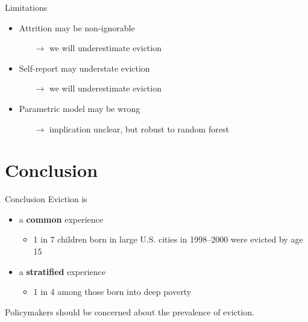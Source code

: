 \documentclass{beamer}
\newcommand\bblue[1]{{\color{blue}\textbf{#1}}}
\begin{document}
\begin{frame}{Limitations}
\begin{itemize}
\item Attrition may be non-ignorable \pause
\begin{itemize}
\item[$\rightarrow$] we will underestimate eviction
\end{itemize} \pause
\item Self-report may understate eviction \pause 
\begin{itemize}
\item[$\rightarrow$] we will underestimate eviction \pause
\end{itemize}
\item Parametric model may be wrong \pause
\begin{itemize}
\item[$\rightarrow$] implication unclear, but robust to random forest
\end{itemize}
\end{itemize}
\end{frame}

\section{Conclusion}

\begin{frame}{Conclusion}
Eviction is 
\begin{itemize}
\item a \bblue{common} experience
\begin{itemize}
\item 1 in 7 children born in large U.S. cities in 1998--2000 were evicted by age 15
\end{itemize}
\item a \bblue{stratified} experience
\begin{itemize}
\item 1 in 4 among those born into deep poverty
\end{itemize}
\end{itemize}
\begin{center}
Policymakers should be concerned about the prevalence of eviction.
\end{center}
\end{frame}
\end{document}
